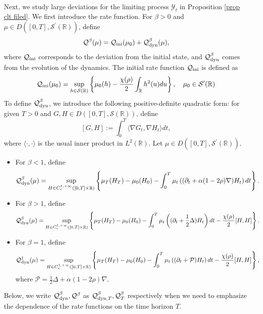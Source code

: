 \documentclass[reqno,11pt]{amsart}
\numberwithin{equation}{section}
\newcommand{\R}{\mathbb{R}}
\newcommand{\Scal}{\mathcal{S}}
\begin{document}
Next, we study large deviations for the limiting process $\mathcal{Y}_t$ in Proposition \ref{prop clt filed}. We first introduce the  rate function.  For  $\beta>0$ and $\mu\in D ([0, T], \Scal^\prime(\R))$, define
\begin{equation}\label{equ mdp rate function of the fluctuation field}
    \mathcal{Q}^\beta(\mu)=\mathcal{Q}_{\rm ini}(\mu_0)+\mathcal{Q}_{\rm dyn}^\beta(\mu),
\end{equation}
where $\mathcal{Q}_{\rm ini}$ corresponds to the deviation from the initial state, and $\mathcal{Q}_{\rm dyn}^\beta$ comes from the evolution of the dynamics. The initial rate function $\mathcal{Q}_{\rm ini}$ is defined as 
\[
\mathcal{Q}_{\rm ini}(\mu_0)=\sup_{h\in \Scal(\R)}\left\{\mu_0 (h)-\frac{\chi(\rho)}{2}\int_\mathbb{R}h^2(u)du\right\}, \quad \mu_0 \in \Scal^\prime(\R)
\]
To define $\mathcal{Q}_{\rm dyn}^\beta$, we introduce the following positive-definite quadratic form:  for given $T>0$ and $G,H\in D ([0, T], \Scal(\R))$,  define
\[
[G, H]:= \int_0^T\langle \nabla G_t, \nabla H_t \rangle dt,
\]
where $\langle \cdot,\cdot \rangle$ is the usual inner product in $L^2 (\R)$. Let $\mu\in D ([0, T], \Scal^\prime(\R))$.
\begin{itemize}
	\item For $\beta<1$,  define
	\begin{equation}\label{equ dynamic mdp rate sub}
		\mathcal{Q}_{\rm dyn}^\beta(\mu)=\sup_{H\in C_c^{1,+\infty}([0, T]\times \mathbb{R})}\left\{\mu_T(H_T)-\mu_0(H_0)-\int_0^T\mu_t\left((\partial_t+\alpha(1-2\rho)\nabla)H_t\right)dt\right\}.    
	\end{equation}
	\item For $\beta>1$, define
	\begin{equation}\label{equ dynamic mdp rate sup}
		\mathcal{Q}_{\rm dyn}^\beta(\mu)
		=\sup_{H\in C_c^{1,+\infty}([0, T]\times \mathbb{R})}\left\{\mu_T(H_T)-\mu_0(H_0)-\int_0^T\mu_t\left((\partial_t+\frac{1}{2}\Delta)H_t\right)dt-\frac{\chi(\rho)}{2}[H, H]\right\}.  
	\end{equation}
	\item For $\beta=1$, define
	\begin{equation}\label{equ dynamic mdp rate cri}
		\mathcal{Q}_{\rm dyn}^1(\mu)
		=\sup_{H\in C_c^{1,+\infty}([0, T]\times \mathbb{R})}\left\{\mu_T(H_T)-\mu_0(H_0)-\int_0^T\mu_t\left((\partial_t+\mathcal{P})H_t\right)dt-\frac{\chi(\rho)}{2}[H, H]\right\}, 
	\end{equation}
	where $\mathcal{P}=\frac{1}{2}\Delta+\alpha(1-2\rho)\nabla$. 
\end{itemize}
Below, we write $\mathcal{Q}_{\rm dyn}^\beta, \mathcal{Q}^\beta$ as $\mathcal{Q}_{{\rm dyn}, T}^\beta, \mathcal{Q}_T^\beta$ respectively when we need to emphasize the dependence of the rate functions on the time horizon $T$. 
\end{document}
